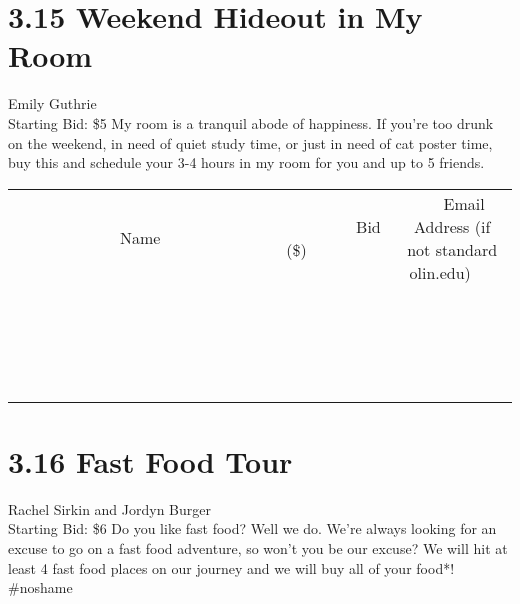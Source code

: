 \documentclass[11pt]{article}
\begin{document}
\section*{3.15 Weekend Hideout in My Room}
Emily Guthrie
\\
Starting Bid: \$5
\newline
My room is a tranquil abode of happiness. If you're too drunk on the weekend, in need of quiet study time, or just in need of cat poster time, buy this and schedule your 3-4 hours in my room for you and up to 5 friends.
\\[3ex]
\begin{tabular}{c c c}
~~~~~~~~~~~~~Name~~~~~~~~~~~~~ & ~~~~~~~~~Bid (\$)~~~~~~~~~  & ~~~Email Address (if not standard olin.edu)~~~\\
 & & \\
\hline
 & & \\
\hline
 & & \\
\hline
 & & \\
\hline
 & & \\
\hline
 & & \\
\hline
 & & \\
\hline
 & & \\
\hline
 & & \\
\hline
 & & \\
\hline
 & & \\
\hline
 & & \\
\hline
 & & \\
\hline
 & & \\
\hline
 & & \\
\hline
 & & \\
\hline
 & & \\
\hline
 & & \\
\hline
 & & \\
\hline
\end{tabular}
\newpage
\section*{3.16 Fast Food Tour}
Rachel Sirkin and Jordyn Burger
\\
Starting Bid: \$6
\newline
Do you like fast food? Well we do. We're always looking for an excuse to go on a fast food adventure, so won't you be our excuse? We will hit at least 4 fast food places on our journey and we will buy all of your food*! \#noshame
\end{document}
